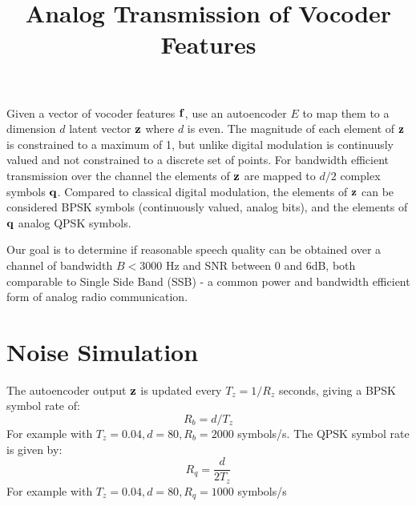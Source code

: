 \documentclass{article}
\begin{document}
\title{Analog Transmission of Vocoder Features}
\maketitle

Given a vector of vocoder features $\bf{f}$, use an autoencoder $E$ to map them to a dimension $d$ latent vector $\bf{z}$ where $d$ is even.  The magnitude of each element of $\bf{z}$ is constrained to a maximum of 1, but unlike digital modulation is continuusly valued and not constrained to a discrete set of points. For bandwidth efficient transmission over the channel the elements of $\bf{z}$ are mapped to $d/2$ complex symbols $\bf{q}$. Compared to classical digital modulation, the elements of $\bf{z}$ can be considered BPSK symbols (continuously valued, analog bits), and the elements of $\bf{q}$ analog QPSK symbols.

Our goal is to determine if reasonable speech quality can be obtained over a channel of bandwidth $B<3000$ Hz and SNR between 0 and 6dB, both comparable to Single Side Band (SSB) - a common power and bandwidth efficient form of analog radio communication.

\section{Noise Simulation}

The autoencoder output $\bf{z}$ is updated every $T_z=1/R_z$ seconds, giving a BPSK symbol rate of:
\begin{equation}
R_b=d/T_z
\end{equation}
For example with $T_z=0.04, d=80, R_b=2000$ symbols/s.  The QPSK symbol rate is given by:
\begin{equation}
R_q = \frac{d}{2T_z} 
\end{equation}
For example with $T_z=0.04, d=80, R_q=1000$ symbols/s
\end{document}
